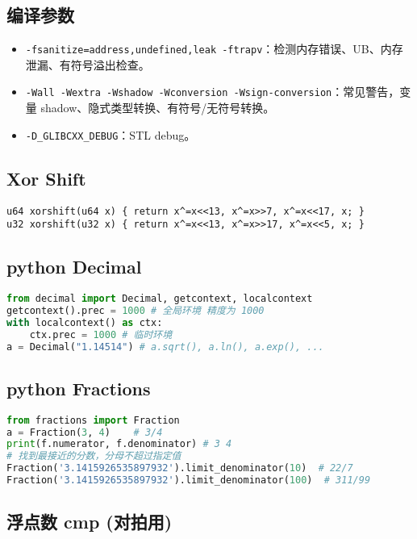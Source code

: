 \documentclass[a4paper,landscape,twocolumn]{ctexart}
\begin{document}
\subsection{编译参数}

\begin{itemize}
\item \texttt{-fsanitize=address,undefined,leak -ftrapv}：检测内存错误、UB、内存泄漏、有符号溢出检查。
\item \texttt{-Wall -Wextra -Wshadow -Wconversion -Wsign-conversion}：常见警告，变量 shadow、隐式类型转换、有符号/无符号转换。
\item \texttt{-D\_GLIBCXX\_DEBUG}：STL debug。
\end{itemize}

\subsection{Xor \space Shift}

\begin{lstlisting}
u64 xorshift(u64 x) { return x^=x<<13, x^=x>>7, x^=x<<17, x; }
u32 xorshift(u32 x) { return x^=x<<13, x^=x>>17, x^=x<<5, x; }
\end{lstlisting}

\subsection{python Decimal}

\begin{lstlisting}[language=python]
from decimal import Decimal, getcontext, localcontext
getcontext().prec = 1000 # 全局环境 精度为 1000
with localcontext() as ctx:
	ctx.prec = 1000 # 临时环境
a = Decimal("1.14514") # a.sqrt(), a.ln(), a.exp(), ...
\end{lstlisting}

\subsection{python Fractions}

\begin{lstlisting}[language=python]
from fractions import Fraction
a = Fraction(3, 4)    # 3/4
print(f.numerator, f.denominator) # 3 4
# 找到最接近的分数，分母不超过指定值
Fraction('3.1415926535897932').limit_denominator(10)  # 22/7
Fraction('3.1415926535897932').limit_denominator(100)  # 311/99
\end{lstlisting}

\subsection{浮点数 cmp (对拍用)}
\end{document}
